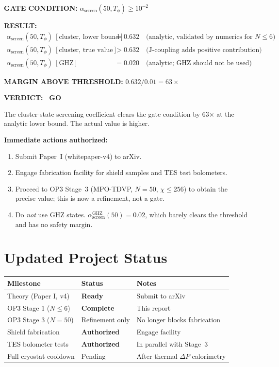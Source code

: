 \documentclass[11pt,letterpaper]{article}
\newcommand{\asc}{\alpha_{\mathrm{screen}}}
\newcommand{\Tp}{T_\phi}
\begin{document}
\begin{verdict}
\textbf{GATE CONDITION:} $\asc(50,\Tp) \geq 10^{-2}$

\textbf{RESULT:}
\begin{align*}
  \asc(50,\Tp)\ [\text{cluster, lower bound}]
  &= 0.632 \quad \text{(analytic, validated by numerics for } N \leq 6\text{)} \\
  \asc(50,\Tp)\ [\text{cluster, true value}]
  &> 0.632 \quad \text{(J-coupling adds positive contribution)} \\
  \asc(50,\Tp)\ [\text{GHZ}]
  &= 0.020 \quad \text{(analytic; GHZ should not be used)}
\end{align*}

\textbf{MARGIN ABOVE THRESHOLD:} $0.632 / 0.01 = 63\times$

\bigskip
\textbf{VERDICT: }\textcolor{green!50!black}{\bfseries\checkmark\ GO}

\smallskip
The cluster-state screening coefficient clears the gate condition by 63× at the
analytic lower bound.  The actual value is higher.

\bigskip
\textbf{Immediate actions authorized:}
\begin{enumerate}[noitemsep]
  \item Submit Paper~I (whitepaper-v4) to arXiv.
  \item Engage fabrication facility for shield samples and TES test bolometers.
  \item Proceed to OP3 Stage~3 (MPO-TDVP, $N=50$, $\chi \leq 256$) to obtain
    the precise value; this is now a refinement, not a gate.
  \item Do \emph{not} use GHZ states. $\asc^{\mathrm{GHZ}}(50) = 0.02$,
    which barely clears the threshold and has no safety margin.
\end{enumerate}
\end{verdict}

\section{Updated Project Status}

\begin{center}\small
\begin{tabular}{@{}p{4cm}p{3cm}p{5.5cm}@{}}
\toprule
Milestone & Status & Notes \\
\midrule
Theory (Paper I, v4) & \textcolor{green!50!black}{\bfseries Ready} & Submit to arXiv \\
OP3 Stage 1 ($N \leq 6$) & \textcolor{green!50!black}{\bfseries Complete} & This report \\
OP3 Stage 3 ($N = 50$) & Refinement only & No longer blocks fabrication \\
Shield fabrication & \textcolor{green!50!black}{\bfseries Authorized} & Engage facility \\
TES bolometer tests & \textcolor{green!50!black}{\bfseries Authorized} & In parallel with Stage~3 \\
Full cryostat cooldown & Pending & After thermal $\Delta P$ calorimetry \\
\bottomrule
\end{tabular}
\end{center}
\end{document}
